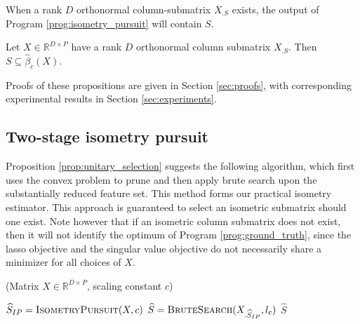 When a rank $D$ orthonormal column-submatrix $X_{.S}$ exists, the output of Program \ref{prog:isometry_pursuit} will contain $S$.
\begin{proposition}
Let $X \in \mathbb R^{D \times P}$ have a rank $D$ orthonormal column submatrix $X_{.S}$.
Then $S \subseteq \widehat \beta_c ( X)$.
\label{prop:unitary_selection}
\end{proposition}

Proofs of these propositions are given in Section \ref{sec:proofs}, with corresponding experimental results in Section \ref{sec:experiments}.

\subsection{Two-stage isometry pursuit}

Proposition \ref{prop:unitary_selection} suggests the following algorithm, which first uses the convex problem to prune and then apply brute search upon the substantially reduced feature set.
This method forms our practical isometry estimator.
This approach is guaranteed to select an isometric submatrix should one exist.
Note however that if an isometric column submatrix does not exist, then it will not identify the optimum of Program \ref{prog:ground_truth}, since the lasso objective and the singular value objective do not necessarily share a minimizer for all choices of $X$.

\begin{algorithm}[H]
\caption{\tsip(Matrix ${X} \in \mathbb{R}^{D \times P}$, scaling constant $c$)}
\begin{algorithmic}[1]
\STATE $\widehat{S}_{IP} = \text{{\sc IsometryPursuit}}( X, c)$
\STATE $\widehat{S} = \text {{\sc BruteSearch}}({X}_{.\widehat{S}_{IP}}, l_c)$
 $\widehat{S}$
\end{algorithmic}
\end{algorithm}

